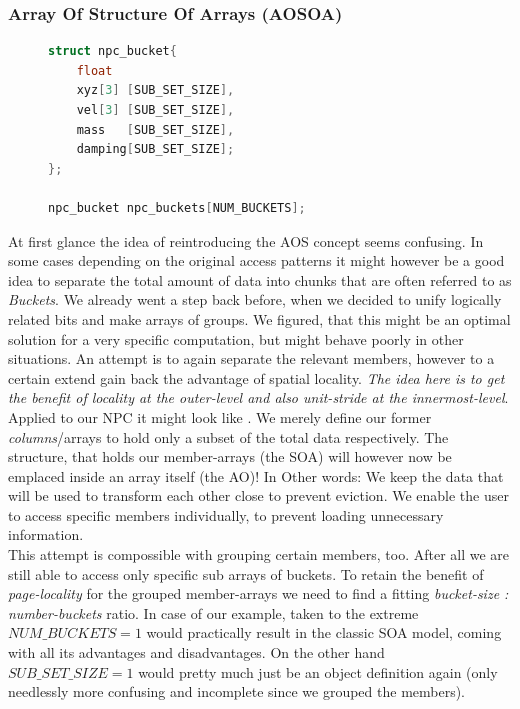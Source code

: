 \subsubsection{Array Of Structure Of Arrays (AOSOA)}
\begin{figure}
\begin{lstlisting}[language=C++,numbers=none,name={AOSOA variant of grouped NPC traits},label={aosoa_npc}]
struct npc_bucket{
	float
	xyz[3] [SUB_SET_SIZE],
	vel[3] [SUB_SET_SIZE],
	mass   [SUB_SET_SIZE],
	damping[SUB_SET_SIZE];
};

npc_bucket npc_buckets[NUM_BUCKETS];
\end{lstlisting}
\end{figure}
At first glance the idea of reintroducing the AOS concept seems confusing. In some cases depending on the original access patterns it might however be a good idea to separate the total amount of data into chunks that are often referred to as \textit{Buckets}. We already went a step back before, when we decided to unify logically related bits and make arrays of groups. We figured, that this might be an optimal solution for a very specific computation, but might behave poorly in other situations. An attempt is to again separate the relevant members, however to a certain extend gain back the advantage of spatial locality. \textit{The idea here is to get the benefit of locality at the outer-level and also unit-stride at the innermost-level}. Applied to our NPC it might look like . We merely define our former \textit{columns}/arrays to hold only a subset of the total data respectively. The structure, that holds our member-arrays (the SOA) will however now be emplaced inside an array itself (the AO)! In Other words: We keep the data that will be used to transform each other close to prevent eviction. We enable the user to access specific members individually, to prevent loading unnecessary information.\\
This attempt is compossible with grouping certain members, too. After all we are still able to access only specific sub arrays of buckets. To retain the benefit of \textit{page-locality} for the grouped member-arrays we need to find a fitting \textit{bucket-size : number-buckets} ratio. In case of our  example, taken to the extreme $\textit{NUM\_BUCKETS}=1$ would practically result in the classic SOA model, coming with all its advantages and disadvantages. On the other hand $\textit{SUB\_SET\_SIZE}=1$ would pretty much just be an object definition again (only needlessly more confusing and incomplete since we grouped the members).\\
